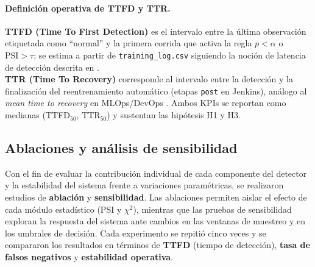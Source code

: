 \paragraph{Definición operativa de TTFD y TTR.}
\textbf{TTFD (Time To First Detection)} es el intervalo entre la última observación etiquetada como “normal” y la primera corrida que activa la regla $p<\alpha$ o $\mathrm{PSI}>\tau$; se estima a partir de \texttt{training\_log.csv} siguiendo la noción de latencia de detección descrita en \cite{Sethi2017,Chawla2021}.\\
\textbf{TTR (Time To Recovery)} corresponde al intervalo entre la detección y la finalización del reentrenamiento automático (etapas \texttt{post} en Jenkins), análogo al \textit{mean time to recovery} en MLOps/DevOps \citep{Amershi2019}. Ambos KPIs se reportan como medianas (TTFD$_{50}$, TTR$_{50}$) y sustentan las hipótesis H1 y H3.


\subsection{Ablaciones y análisis de sensibilidad}
\label{subsec:eval-ablation}

Con el fin de evaluar la contribución individual de cada componente del detector y la estabilidad del sistema frente a variaciones paramétricas, se realizaron estudios de \textbf{ablación} y \textbf{sensibilidad}.  
Las ablaciones permiten aislar el efecto de cada módulo estadístico (PSI y $\chi^2$), mientras que las pruebas de sensibilidad exploran la respuesta del sistema ante cambios en las ventanas de muestreo y en los umbrales de decisión.  
Cada experimento se repitió cinco veces y se compararon los resultados en términos de \textbf{TTFD} (tiempo de detección), \textbf{tasa de falsos negativos} y \textbf{estabilidad operativa}.

